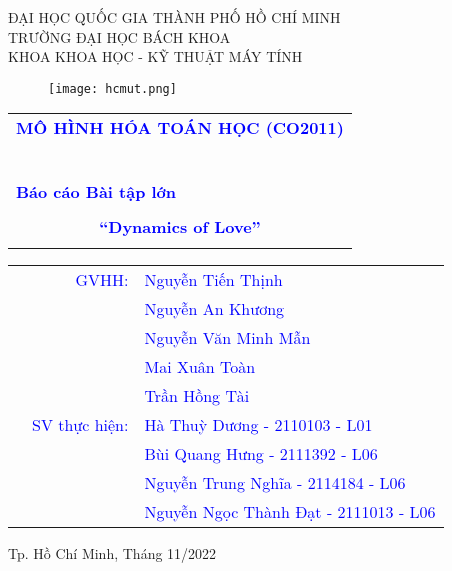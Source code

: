 \documentclass[a4paper]{article}
\begin{document}
\begin{titlepage}
\begin{center}
ĐẠI HỌC QUỐC GIA THÀNH PHỐ HỒ CHÍ MINH \\
TRƯỜNG ĐẠI HỌC BÁCH KHOA \\
KHOA KHOA HỌC - KỸ THUẬT MÁY TÍNH
\end{center}

\vspace{1cm}

\begin{figure}[h!]
\begin{center}
\texttt{[image: hcmut.png]}
\end{center}
\end{figure}

\vspace{1cm}


\begin{center}
\begin{tabular}{c}
\multicolumn{1}{l}{\textbf{{\Large \textcolor{blue}{MÔ HÌNH HÓA TOÁN HỌC (CO2011)}}}}\\
~~\\
\arrayrulecolor{blue}\hline
\\
\multicolumn{1}{l}{\textbf{{\Large \textcolor{blue}{Báo cáo Bài tập lớn}}}}\\
\\
\textbf{{\Huge \textcolor{blue}{“Dynamics of Love”}}}\\
\\
\hline
\end{tabular}
\end{center}

\vspace{2cm}

\begin{table}[h]
\begin{tabular}{rrl}
\hspace{5 cm} & \textcolor{blue}{GVHH:} & \textcolor{blue}{Nguyễn Tiến Thịnh}\\
& & \textcolor{blue}{Nguyễn An Khương}\\
& & \textcolor{blue}{Nguyễn Văn Minh Mẫn}\\
& & \textcolor{blue}{Mai Xuân Toàn}\\
& & \textcolor{blue}{Trần Hồng Tài}\\
& \textcolor{blue}{SV thực hiện:} & \textcolor{blue}{Hà Thuỳ Dương - 2110103 - L01}\\
& & \textcolor{blue}{Bùi Quang Hưng - 2111392 - L06}\\
& & \textcolor{blue}{Nguyễn Trung Nghĩa - 2114184 - L06}\\
& & \textcolor{blue}{Nguyễn Ngọc Thành Đạt - 2111013 - L06}\\
\end{tabular}
\end{table}

\begin{center}
{\footnotesize Tp. Hồ Chí Minh, Tháng 11/2022}
\end{center}
\end{titlepage}
\end{document}
